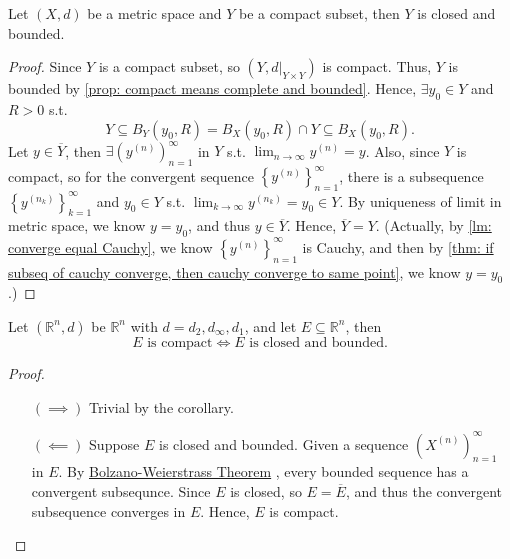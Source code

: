\begin{corollary}
    Let \((X, d)\) be a metric space and \(Y\) be a compact subset, then \(Y\) is closed and bounded.    
\end{corollary}
\begin{proof}
    Since \(Y\) is a compact subset, so \(\left( Y, d\vert_{Y \times Y} \right) \) is compact. Thus, \(Y\) is bounded by  \autoref{prop: compact means complete and bounded}. Hence, \(\exists y_0 \in Y\) and \(R > 0\) s.t. 
    \[
        Y \subseteq B_Y(y_0, R) =  B_X(y_0, R) \cap Y \subseteq B_X(y_0, R).
    \]   
    Let \(y \in \overline{Y} \), then \(\exists \left( y^{(n)} \right)_{n=1}^{\infty}  \) in \(Y\) s.t. \(\lim_{n \to \infty} y^{(n)} = y \). Also, since \(Y\) is compact, so for the convergent sequence \(\left\{ y^{(n)} \right\}_{n=1}^{\infty}  \), there is a subsequence \(\left\{ y^{(n_k)} \right\}_{k=1}^{\infty}  \) and \(y_0 \in Y\)  s.t. \(\lim_{k \to \infty}  y^{(n_k)}= y_0 \in Y\). By uniqueness of limit in metric space, we know \(y = y_0\), and thus \(y \in \overline{Y} \). Hence, \(\overline{Y} = Y \). (Actually, by \autoref{lm: converge equal Cauchy}, we know \(\left\{ y^{(n)} \right\}_{n=1}^{\infty} \) is Cauchy, and then by \autoref{thm: if subseq of cauchy converge, then cauchy converge to same point}, we know \(y = y_0\).)    
\end{proof}

\begin{theorem} \label{thm: Heine Borel thm}
    Let \(\left( \mathbb{R} ^n, d \right) \) be \(\mathbb{R} ^n\) with \(d = d_2, d_\infty , d_1\), and let \(E \subseteq \mathbb{R} ^n\), then 
    \[
        E \text{ is compact} \iff E \text{ is closed and bounded}.
    \]  
\end{theorem}
\begin{proof}
    \vphantom{text}
    \begin{itemize}
        \item [\((\implies )\)] Trivial by the corollary. 
        \item [\((\impliedby )\)] Suppose \(E\) is closed and bounded. Given a sequence \(\left( X^{(n)} \right)_{n=1}^{\infty}  \) in \(E\). By \hyperref[thm: Bolzano Weierstrass thm]{Bolzano-Weierstrass Theorem} , every bounded sequence has a convergent subsequnce. Since \(E\) is closed, so \(E = \overline{E} \), and thus the convergent subsequence converges in \(E\). Hence, \(E\) is compact.   
    \end{itemize}
\end{proof}

